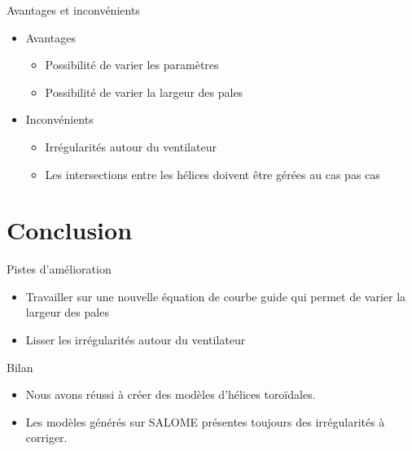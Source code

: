 \documentclass{beamer}
\begin{document}
\begin{frame}{Avantages et inconvénients}
    \begin{itemize}
        \item Avantages
        \begin{itemize}
            \item Possibilité de varier les paramètres
            \item Possibilité de varier la largeur des pales
        \end{itemize}
        \item Inconvénients
        \begin{itemize}
            \item Irrégularités autour du ventilateur
            \item Les intersections entre les hélices doivent être gérées au cas pas cas
        \end{itemize}
    \end{itemize}
\end{frame}

\section{Conclusion}

\begin{frame}{Pistes d'amélioration}
    \begin{itemize}
        \item Travailler sur une nouvelle équation de courbe guide qui permet de varier la largeur des pales
        \item Lisser les irrégularités autour du ventilateur
    \end{itemize}
\end{frame}

\begin{frame}{Bilan}
    \begin{itemize}
        \item Nous avons réussi à créer des modèles d'hélices toroïdales.
        \item Les modèles générés sur SALOME présentes toujours des irrégularités à corriger.
    \end{itemize}
\end{frame}
\end{document}
